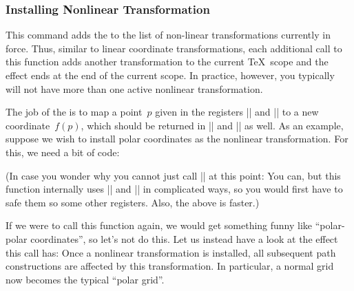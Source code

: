\subsubsection{Installing Nonlinear Transformation}

\begin{codeexample}
\makeatletter
\def\polartransformation{
  \pgfmathsincos@{\pgf@sys@tonumber\pgf@x}%
  \pgf@x=\pgfmathresultx\pgf@y%
  \pgf@y=\pgfmathresulty\pgf@y%
}
\makeatother
\end{codeexample}

\begin{command}{\pgftransformnonlinear{}}
    This command adds the  to the list of non-linear
    transformations currently in force. Thus, similar to linear coordinate
    transformations, each additional call to this function adds another
    transformation to the current \TeX\ scope and the effect ends at the end of
    the current scope. In practice, however, you typically will not have more
    than one active nonlinear transformation.

    The job of the  is to map a point~$p$ given in
    the registers |\pgf@x| and |\pgf@y| to a new coordinate~$f(p)$, which
    should be returned in |\pgf@x| and |\pgf@y| as well. As an example, suppose
    we wish to install polar coordinates as the nonlinear transformation. For
    this, we need a bit of code:
\begin{codeexample}
\def\polartransformation{%
  \pgfmathsincos@{\pgf@sys@tonumber\pgf@x}%
  \pgf@x=\pgfmathresultx\pgf@y%
  \pgf@y=\pgfmathresulty\pgf@y%
}
\end{codeexample}
    (In case you wonder why you cannot just call |\pgfpointpolar| at this
    point: You can, but this function internally uses |\pgf@x| and |\pgf@y| in
    complicated ways, so you would first have to safe them so some other
    registers. Also, the above is faster.)

    If we were to call this function again, we would get something funny like
    ``polar-polar coordinates'', so let's not do this. Let us instead have a
    look at the effect this call has: Once a nonlinear transformation is
    installed, all subsequent path constructions are affected by this
    transformation. In particular, a normal grid now becomes the typical
    ``polar grid''.
\begin{codeexample}[preamble={\usepgfmodule{nonlineartransformations}}]
\end{codeexample}
\end{command}
